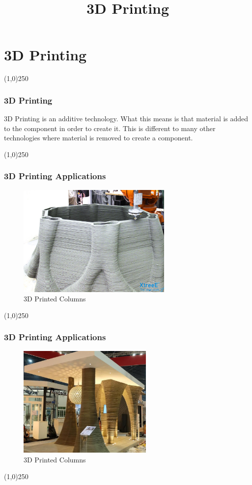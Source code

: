 \section{3D Printing}
\begin{frame}

\title[3D Printing]{3D Printing}
\titlepage
\end{frame}\begin{center}\line(1,0){250}\end{center}

\begin{frame}
\frametitle{3D Printing}
3D Printing is an additive technology.  What this means is that material is added to the component in order to create it.  This is different to many other technologies where material is removed to create a component.

\end{frame}
\begin{center}\line(1,0){250}\end{center}


\begin{frame}
\frametitle{3D Printing Applications}
\begin{figure}[h]
	\centering
	\includegraphics[height=5.5cm]{img/3DPrinting/3dprintedColumn.jpg}
	\caption[3D Printed Columns]{3D Printed Columns}
	\label{fig:3dprintcolumn}
\end{figure}
\end{frame}
\begin{center}\line(1,0){250}\end{center}


\begin{frame}
\frametitle{3D Printing Applications}
\begin{figure}[h]
	\centering
	\includegraphics[height=5.5cm]{img/3DPrinting/3dprintColumn.jpg}
	\caption[3D Printed Columns]{3D Printed Columns}
	\label{fig:multiple3dprintcolumn}
\end{figure}
\end{frame}
\begin{center}\line(1,0){250}\end{center}




